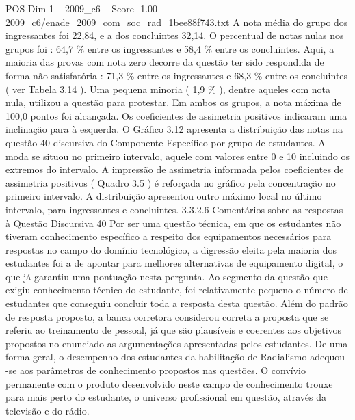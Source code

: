 \begin{textsample}{POS Dim 1 – 2009\_c6 – Score -1.00 – 2009\_c6/enade\_2009\_com\_soc\_rad\_1bee88f743.txt}
A nota média do grupo dos ingressantes foi 22,84, e a dos concluintes 32,14.
O percentual de notas nulas nos grupos foi : 64,7 \% entre os ingressantes e 58,4 \% entre os concluintes.
Aqui, a maioria das provas com nota zero decorre da questão ter sido respondida de forma não satisfatória : 71,3 \% entre os ingressantes e 68,3 \% entre os concluintes ( ver Tabela 3.14 ).
Uma pequena minoria ( 1,9 \% ), dentre aqueles com nota nula, utilizou a questão para protestar.
Em ambos os grupos, a nota máxima de 100,0 pontos foi alcançada.
Os coeficientes de assimetria positivos indicaram uma inclinação para à esquerda.
O Gráfico 3.12 apresenta a distribuição das notas na questão 40 discursiva do Componente Específico por grupo de estudantes.
A moda se situou no primeiro intervalo, aquele com valores entre 0 e 10 incluindo os extremos do intervalo.
A impressão de assimetria informada pelos coeficientes de assimetria positivos ( Quadro 3.5 ) é reforçada no gráfico pela concentração no primeiro intervalo.
A distribuição apresentou outro máximo local no último intervalo, para ingressantes e concluintes. 3.3.2.6 Comentários sobre as respostas à Questão Discursiva 40 Por ser uma questão técnica, em que os estudantes não tiveram conhecimento específico a respeito dos equipamentos necessários para respostas no campo do domínio tecnológico, a digressão eleita pela maioria dos estudantes foi a de apontar para melhores alternativas de equipamento digital, o que já garantiu uma pontuação nesta pergunta.
Ao segmento da questão que exigiu conhecimento técnico do estudante, foi relativamente pequeno o número de estudantes que conseguiu concluir toda a resposta desta questão.
Além do padrão de resposta proposto, a banca corretora considerou correta a proposta que se referiu ao treinamento de pessoal, já que são plausíveis e coerentes aos objetivos propostos no enunciado as argumentações apresentadas pelos estudantes.
De uma forma geral, o desempenho dos estudantes da habilitação de Radialismo adequou -se aos parâmetros de conhecimento propostos nas questões.
O convívio permanente com o produto desenvolvido neste campo de conhecimento trouxe para mais perto do estudante, o universo profissional em questão, através da televisão e do rádio.

\end{textsample}
